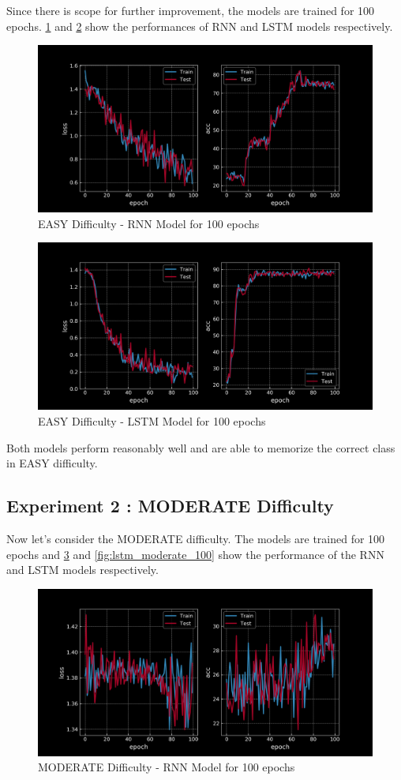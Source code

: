 Since there is scope for further improvement, the models are trained for 100 epochs. 
\cref{fig:rnn_easy_100} and \cref{fig:lstm_easy_100} show the performances of RNN and LSTM models respectively.

\begin{figure}[H]
    \centering
    \includegraphics[width=0.5\linewidth]{labs/08/images/rnn_easy_100.png}
    \caption{EASY Difficulty - RNN Model for 100 epochs}
    \label{fig:rnn_easy_100}
\end{figure}

\begin{figure}[H]
    \centering
    \includegraphics[width=0.5\linewidth]{labs/08/images/lstm_easy_100.png}
    \caption{EASY Difficulty - LSTM Model for 100 epochs}
    \label{fig:lstm_easy_100}
\end{figure}
Both models perform reasonably well and are able to memorize the correct class in EASY difficulty. 

\subsection{Experiment 2 : MODERATE Difficulty}
Now let's consider the MODERATE difficulty. The models are trained for 100 epochs and \cref{fig:rnn_moderate_100} and \cref{fig:lstm_moderate_100} show the performance of the RNN and LSTM models respectively.

\begin{figure}[H]
    \centering
    \includegraphics[width=0.5\linewidth]{labs/08/images/rnn_moderate_100.png}
    \caption{MODERATE Difficulty - RNN Model for 100 epochs}
    \label{fig:rnn_moderate_100}
\end{figure}

